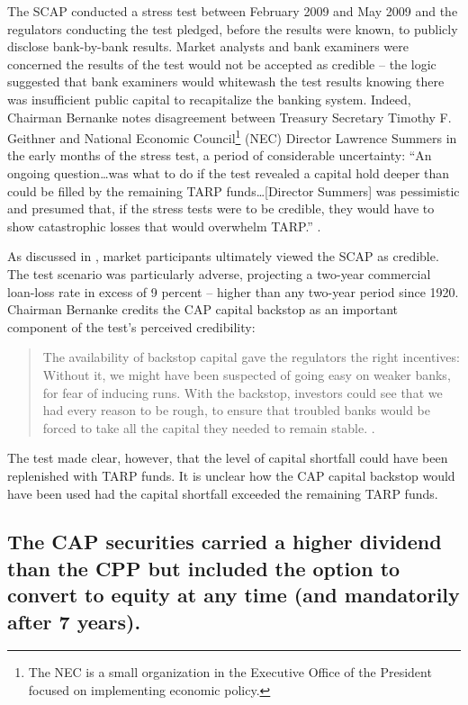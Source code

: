 \documentclass[12pt]{article}
\begin{document}
The SCAP conducted a stress test between February 2009 and May 2009 and the regulators conducting the test pledged, before the results were known, to publicly disclose bank-by-bank results. Market analysts and bank examiners were concerned the results of the test would not be accepted as credible -- the logic suggested that bank examiners would whitewash the test results knowing there was insufficient public capital to recapitalize the banking system. Indeed, Chairman Bernanke notes disagreement between Treasury Secretary Timothy F. Geithner and National Economic Council\footnote{The NEC is a small organization in the Executive Office of the President focused on implementing economic policy.} (NEC) Director Lawrence Summers in the early months of the stress test, a period of considerable uncertainty: ``An ongoing question\dots was what to do if the test revealed a capital hold deeper than could be filled by the remaining TARP funds\dots [Director Summers] was pessimistic and presumed that, if the stress tests were to be credible, they would have to show catastrophic losses that would overwhelm TARP.'' \citep{Bernanke}.

As discussed in \citet{Ross2016a}, market participants ultimately viewed the SCAP as credible. The test scenario was particularly adverse, projecting a two-year commercial loan-loss rate in excess of 9 percent -- higher than any two-year period since 1920. Chairman Bernanke credits the CAP capital backstop as an important component of the test's perceived credibility:
\begin{quote}
The availability of backstop capital gave the regulators the right incentives: Without it, we might have been suspected of going easy on weaker banks, for fear of inducing runs. With the backstop, investors could see that we had every reason to be rough, to ensure that troubled banks would be forced to take all the capital they needed to remain stable. \citep{Bernanke}.
\end{quote}
The test made clear, however, that the level of capital shortfall could have been replenished with TARP funds. It is unclear how the CAP capital backstop would have been used had the capital shortfall exceeded the remaining TARP funds.

\subsection{The CAP securities carried a higher dividend than the CPP but included the option to convert to equity at any time (and mandatorily after 7 years).}
\end{document}
